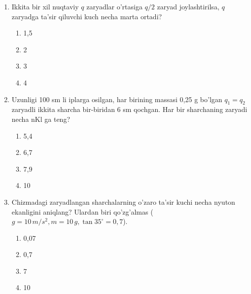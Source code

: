 \begin{enumerate}
\item Ikkita bir xil nuqtaviy $q$ zaryadlar o'rtasiga $q/2$ zaryad joylashtirilsa, $q$ zaryadga ta'sir qiluvchi kuch necha marta ortadi?
\begin{enumerate}[label=\Alph*)]
\item 1,5
\item 2
\item 3
\item 4
\end{enumerate}

\item Uzunligi 100 sm li iplarga osilgan, har birining massasi 0,25 g bo'lgan $q_1 = q_2$ zaryadli ikkita sharcha bir-biridan 6 sm qochgan. Har bir sharchaning zaryadi necha nKl ga teng?
\begin{enumerate}[label=\Alph*)]
\item 5,4
\item 6,7
\item 7,9
\item 10
\end{enumerate}

\item Chizmadagi zaryadlangan sharchalarning o'zaro ta'sir kuchi necha nyuton ekanligini aniqlang? Ulardan biri qo'zg'almas ($g = 10 \, m/s^2, m = 10 \, g, \tan 35^\circ = 0,7$).


\begin{enumerate}[label=\Alph*)]
\item 0,07
\item 0,7
\item 7
\item 10
\end{enumerate}


\end{enumerate}
